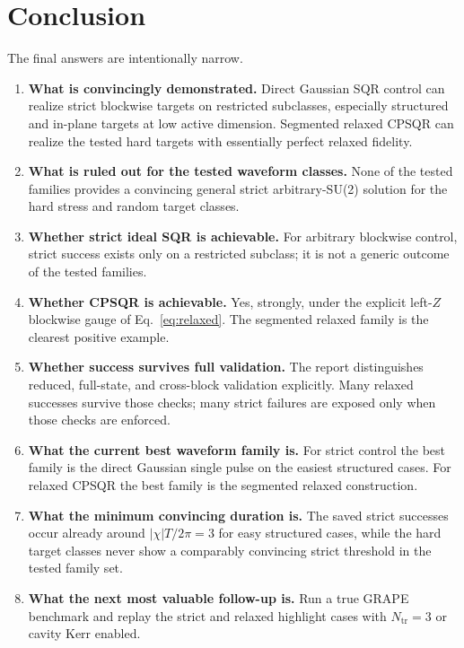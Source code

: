 \documentclass[aps,pra,twocolumn,reprint,floatfix,amsmath,amssymb]{revtex4-2}
\begin{document}
\section{Conclusion}
The final answers are intentionally narrow.

\begin{enumerate}
\item \textbf{What is convincingly demonstrated.}  Direct Gaussian SQR control can realize strict blockwise targets on restricted subclasses, especially structured and in-plane targets at low active dimension.  Segmented relaxed CPSQR can realize the tested hard targets with essentially perfect relaxed fidelity.
\item \textbf{What is ruled out for the tested waveform classes.}  None of the tested families provides a convincing general strict arbitrary-SU(2) solution for the hard stress and random target classes.
\item \textbf{Whether strict ideal SQR is achievable.}  For arbitrary blockwise control, strict success exists only on a restricted subclass; it is not a generic outcome of the tested families.
\item \textbf{Whether CPSQR is achievable.}  Yes, strongly, under the explicit left-$Z$ blockwise gauge of Eq.~\eqref{eq:relaxed}.  The segmented relaxed family is the clearest positive example.
\item \textbf{Whether success survives full validation.}  The report distinguishes reduced, full-state, and cross-block validation explicitly.  Many relaxed successes survive those checks; many strict failures are exposed only when those checks are enforced.
\item \textbf{What the current best waveform family is.}  For strict control the best family is the direct Gaussian single pulse on the easiest structured cases.  For relaxed CPSQR the best family is the segmented relaxed construction.
\item \textbf{What the minimum convincing duration is.}  The saved strict successes occur already around $|\chi|T/2\pi = 3$ for easy structured cases, while the hard target classes never show a comparably convincing strict threshold in the tested family set.
\item \textbf{What the next most valuable follow-up is.}  Run a true GRAPE benchmark and replay the strict and relaxed highlight cases with $N_{\mathrm{tr}}=3$ or cavity Kerr enabled.
\end{enumerate}



\end{document}
